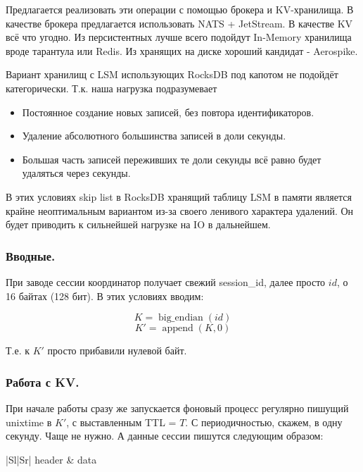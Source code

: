\documentclass[a4paper,12pt]{article}
\begin{document}
Предлагается реализовать эти операции с помощью брокера и KV-хранилища. В качестве брокера предлагается использовать NATS + JetStream.
В качестве KV всё что угодно. Из персистентных лучше всего подойдут In-Memory хранилища вроде тарантула или Redis. Из хранящих
на диске хороший кандидат - Aerospike.

Вариант хранилищ с LSM использующих RocksDB под капотом не подойдёт категорически. Т.к. наша нагрузка подразумевает

\begin{itemize}
\item Постоянное создание новых записей, без повтора идентификаторов.
\item Удаление абсолютного большинства записей в доли секунды.
\item Большая часть записей переживших те доли секунды всё равно будет удаляться через секунды.
\end{itemize}

В этих условиях skip list в RocksDB хранящий таблицу LSM в памяти является крайне неоптимальным вариантом из-за своего
ленивого характера удалений. Он будет приводить к сильнейшей нагрузке на IO в дальнейшем.

\subsubsection{Вводные.}

При заводе сессии координатор получает свежий session\_id, далее просто $id$, о 16 байтах (128 бит). В этих условиях вводим:

$$K=\operatorname{big\_endian}(id)$$
$$K'=\operatorname{append}(K, 0)$$

Т.е. к $K'$ просто прибавили нулевой байт.

\subsubsection{Работа с KV.}

При начале работы сразу же запускается фоновый процесс регулярно пишущий unixtime в $K'$, с выставленным TTL = $T$. С периодичностью, скажем,
в одну секунду. Чаще не нужно. А данные сессии пишутся следующим образом:

\begin{center}
\begin{tabular}{|Sl|Sr|}
    \hline
    header & data \\
    \hline
\end{tabular}
\end{center}
\end{document}
